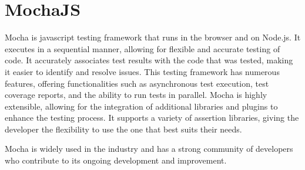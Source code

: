 \section{MochaJS}
Mocha is javascript testing framework that runs in the browser and on Node.js. It executes in a sequential manner, allowing for flexible and accurate testing of code. It accurately 
associates test results with the code that was tested, making it easier to identify and resolve issues. 
This testing framework has numerous features, offering functionalities such as asynchronous test execution, test coverage reports, and the ability to run tests in parallel.
Mocha is highly extensible, allowing for the integration of additional libraries and plugins to enhance the testing process. It supports a
variety of assertion libraries, giving the developer the flexibility to use the one that best suits their needs. 

Mocha is widely used in the industry and has a strong community of developers who contribute to its ongoing development and improvement. \cite{mocha}


